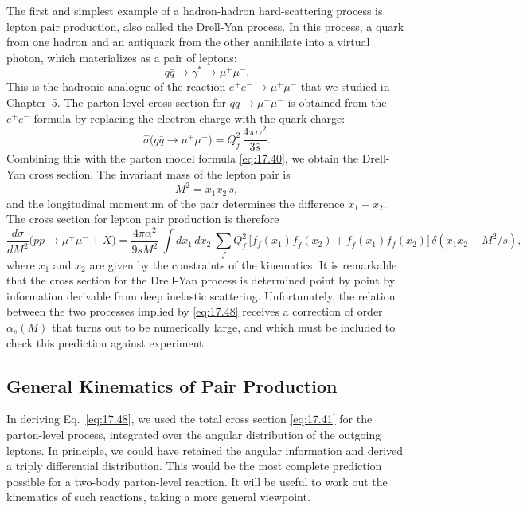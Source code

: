 The first and simplest example of a hadron-hadron hard-scattering process is
lepton pair production, also called the Drell-Yan process.  In this process, a
quark from one hadron and an antiquark from the other annihilate into a
virtual photon, which materializes as a pair of leptons:
\begin{equation}
  q\bar{q} \to \gamma^{*} \to \mu^{+}\mu^{-} .
\end{equation}
This is the hadronic analogue of the reaction $e^{+}e^{-}\to\mu^{+}\mu^{-}$
that we studied in Chapter~5.  The parton-level cross section for
$q\bar{q}\to\mu^{+}\mu^{-}$ is obtained from the $e^{+}e^{-}$ formula by
replacing the electron charge with the quark charge:
\begin{equation}
  \hat{\sigma}\bigl( q\bar{q} \to \mu^{+}\mu^{-} \bigr)
  = Q_f^2\,\frac{4\pi\alpha^2}{3\hat{s}} .
  \label{eq:17.41}
\end{equation}
Combining this with the parton model formula \eqref{eq:17.40}, we obtain the
Drell-Yan cross section.  The invariant mass of the lepton pair is
\begin{equation}
  M^2 = x_1x_2\,s ,
\end{equation}
and the longitudinal momentum of the pair determines the difference
$x_1 - x_2$.  The cross section for lepton pair production is therefore
\begin{equation}
  \frac{d\sigma}{dM^2}\bigl( pp \to \mu^{+}\mu^{-} + X \bigr)
  = \frac{4\pi\alpha^2}{9sM^2}\ \int dx_1\,dx_2\ \sum_f Q_f^2\,
    \bigl[ f_f(x_1)f_{\bar{f}}(x_2) + f_{\bar{f}}(x_1)f_f(x_2) \bigr]\,
    \delta(x_1x_2 - M^2/s) ,
  \label{eq:17.48}
\end{equation}
where $x_1$ and $x_2$ are given by the constraints of the kinematics.  It is
remarkable that the cross section for the Drell-Yan process is determined
point by point by information derivable from deep inelastic scattering.
Unfortunately, the relation between the two processes implied by
\eqref{eq:17.48} receives a correction of order $\alpha_s(M)$ that turns out
to be numerically large, and which must be included to check this prediction
against experiment.

\subsection{General Kinematics of Pair Production}

In deriving Eq.~\eqref{eq:17.48}, we used the total cross section
\eqref{eq:17.41} for the parton-level process, integrated over the angular
distribution of the outgoing leptons.  In principle, we could have retained
the angular information and derived a triply differential distribution.  This
would be the most complete prediction possible for a two-body parton-level
reaction.  It will be useful to work out the kinematics of such reactions,
taking a more general viewpoint.

